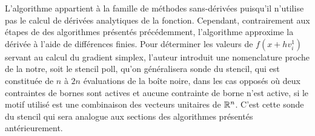 L'algorithme appartient à la famille de méthodes sans-dérivées puisqu'il n'utilise pas le calcul de dérivées analytiques de la fonction. Cependant, contrairement aux étapes de \POLL des algorithmes présentés précédemment, l'algorithme approxime la dérivée à l'aide de différences finies. Pour déterminer les valeurs de $f(x+hv_i^1)$ servant au calcul du gradient simplex, l'auteur introduit une nomenclature proche de la notre, soit le \textsf{stencil poll}, qu'on généralisera sonde du stencil, qui est constituée de $n$ à $2n$ évaluations de la boîte noire, dans les cas opposés où deux contraintes de bornes sont actives et aucune contrainte de borne n'est active, si le motif utilisé est une combinaison des vecteurs unitaires de $\mathbb{R}^n$. C'est cette sonde du stencil qui sera analogue aux sections \POLL des algorithmes présentés antérieurement.

